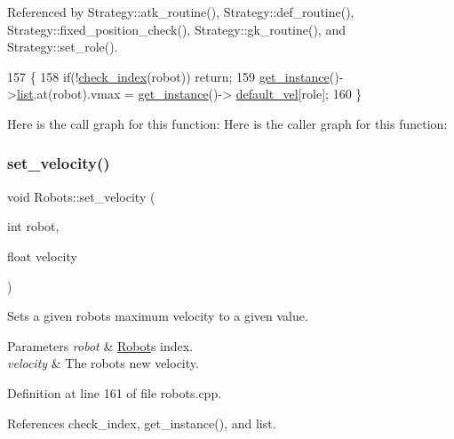 Referenced by Strategy\+::atk\+\_\+routine(), Strategy\+::def\+\_\+routine(), Strategy\+::fixed\+\_\+position\+\_\+check(), Strategy\+::gk\+\_\+routine(), and Strategy\+::set\+\_\+role().


\begin{DoxyCode}
157                                              \{
158     \textcolor{keywordflow}{if}(!\hyperlink{robots_8hpp_ae3e6ae8f87cdc750c0b99bc609d9ae43}{check\_index}(robot)) \textcolor{keywordflow}{return};
159     \hyperlink{class_robots_a589bce74db5f34af384952d48435168f}{get\_instance}()->\hyperlink{class_robots_a2c6b77265028f82a4342ca1ef15ed305}{list}.at(robot).vmax = \hyperlink{class_robots_a589bce74db5f34af384952d48435168f}{get\_instance}()->
      \hyperlink{class_robots_a6c03d49137645a67d5c5e39bb953a788}{default\_vel}[role];
160 \}
\end{DoxyCode}
Here is the call graph for this function\+:
Here is the caller graph for this function\+:
\mbox{\label{class_robots_a0079dd423110e51fb7ce64dc49fdb1c9}} 
\subsubsection{\texorpdfstring{set\+\_\+velocity()}{set\_velocity()}\hspace{0.1cm}{\footnotesize\ttfamily [2/3]}}
{\footnotesize\ttfamily void Robots\+::set\+\_\+velocity (\begin{DoxyParamCaption}\item[{int}]{robot,  }\item[{float}]{velocity }\end{DoxyParamCaption})\hspace{0.3cm}{\ttfamily [static]}}

Sets a given robot\textquotesingle{}s maximum velocity to a given value. 
\begin{DoxyParams}{Parameters}
{\em robot} & \hyperlink{struct_robots_1_1_robot}{Robot}\textquotesingle{}s index. \\
\hline
{\em velocity} & The robot\textquotesingle{}s new velocity. \\
\hline
\end{DoxyParams}


Definition at line 161 of file robots.\+cpp.



References check\+\_\+index, get\+\_\+instance(), and list.


